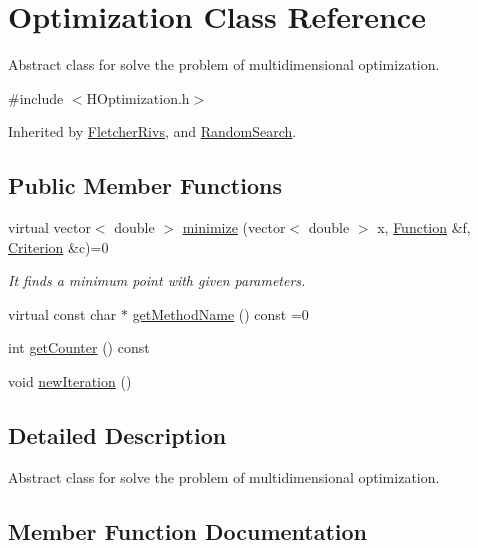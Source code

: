 \hypertarget{class_optimization}{}\section{Optimization Class Reference}
\label{class_optimization}


Abstract class for solve the problem of multidimensional optimization.  




{\ttfamily \#include $<$H\+Optimization.\+h$>$}



Inherited by \hyperlink{class_fletcher_rivs}{Fletcher\+Rivs}, and \hyperlink{class_random_search}{Random\+Search}.

\subsection*{Public Member Functions}
\begin{DoxyCompactItemize}
\item 
virtual vector$<$ double $>$ \hyperlink{class_optimization_af24d30a738749916977a13f0d2e7fb5f}{minimize} (vector$<$ double $>$ x, \hyperlink{class_function}{Function} \&f, \hyperlink{class_criterion}{Criterion} \&c)=0
\begin{DoxyCompactList}\small\item\em It finds a minimum point with given parameters. \end{DoxyCompactList}\item 
virtual const char $\ast$ \hyperlink{class_optimization_af96548088d418478485c1be6ee73905d}{get\+Method\+Name} () const =0
\item 
int \hyperlink{class_optimization_aebd73fb9765b4f78f0b5e96f3bde796f}{get\+Counter} () const
\item 
void \hyperlink{class_optimization_ae65912bf7bd893c28405ee82a38fdba6}{new\+Iteration} ()
\end{DoxyCompactItemize}


\subsection{Detailed Description}
Abstract class for solve the problem of multidimensional optimization. 

\subsection{Member Function Documentation}
\mbox{\label{class_optimization_aebd73fb9765b4f78f0b5e96f3bde796f}} 
